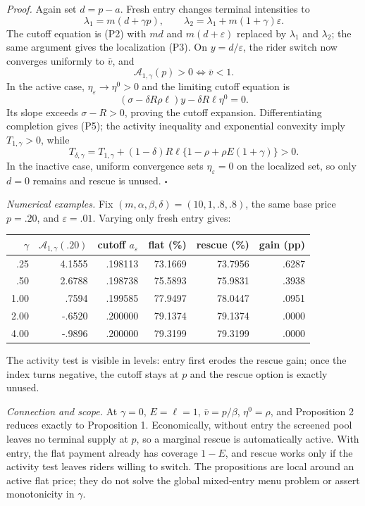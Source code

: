 \documentclass[11pt]{article}
\begin{document}
\medskip
\noindent\textit{Proof.}
Again set $d=p-a$.  Fresh entry changes terminal intensities to
\[
\lambda_1=m(d+\gamma p),\qquad
\lambda_2=\lambda_1+m(1+\gamma)\varepsilon. \tag{P6}
\]
The cutoff equation is (P2) with $md$ and $m(d+\varepsilon)$ replaced by
$\lambda_1$ and $\lambda_2$; the same argument gives the localization (P3).
On $y=d/\varepsilon$, the rider switch now converges uniformly to $\bar v$,
and
\[
\mathcal A_{1,\gamma}(p)>0\iff\bar v<1.
\]
In the active case, $\eta_\varepsilon\to\eta^0>0$ and the limiting cutoff
equation is
\[
(\sigma-\delta R\rho\ell)y-\delta R\ell\eta^0=0. \tag{P7}
\]
Its slope exceeds $\sigma-R>0$, proving the cutoff expansion.  Differentiating
completion gives (P5); the activity inequality and exponential convexity imply
$T_{1,\gamma}>0$, while
\[
T_{\delta,\gamma}=T_{1,\gamma}+(1-\delta)R\ell
\{1-\rho+\rho E(1+\gamma)\}>0.
\]
In the inactive case, uniform convergence sets $\eta_\varepsilon=0$ on the
localized set, so only $d=0$ remains and rescue is unused. \hfill$\square$

\medskip
\noindent\textit{Numerical examples.}
Fix $(m,\alpha,\beta,\delta)=(10,1,.8,.8)$, the same base price $p=.20$,
and $\varepsilon=.01$.  Varying only fresh entry gives:
\begin{center}
\scriptsize
\begin{tabular}{@{}rrrrrr@{}}
\toprule
$\gamma$ & $\mathcal A_{1,\gamma}(.20)$ &
cutoff $a_\varepsilon$ & flat (\%) & rescue (\%) & gain (pp)\\
\midrule
.25 &  4.1555 & .198113 & 73.1669 & 73.7956 & .6287\\
.50 &  2.6788 & .198738 & 75.5893 & 75.9831 & .3938\\
1.00 &  .7594 & .199585 & 77.9497 & 78.0447 & .0951\\
2.00 & -.6520 & .200000 & 79.1374 & 79.1374 & .0000\\
4.00 & -.9896 & .200000 & 79.3199 & 79.3199 & .0000\\
\bottomrule
\end{tabular}
\end{center}
\vspace{-5pt}
\noindent The activity test is visible in levels: entry first erodes the
rescue gain; once the index turns negative, the cutoff stays at $p$ and the
rescue option is exactly unused.

\medskip
\noindent\textit{Connection and scope.}  At $\gamma=0$, $E=\ell=1$,
$\bar v=p/\beta$, $\eta^0=\rho$, and Proposition 2 reduces exactly to
Proposition 1.  Economically, without entry the screened pool leaves no
terminal supply at $p$, so a marginal rescue is automatically active.  With
entry, the flat payment already has coverage $1-E$, and rescue works only if
the activity test leaves riders willing to switch.  The propositions are
local around an active flat price; they do not solve the global mixed-entry
menu problem or assert monotonicity in $\gamma$.
\end{document}
